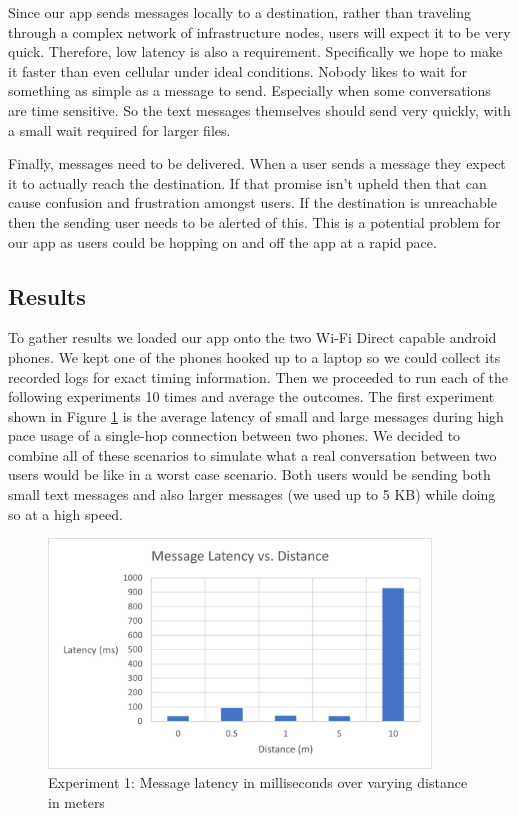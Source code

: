 \documentclass[10pt]{article}
\begin{document}
Since our app sends messages locally to a destination, rather than traveling through a complex network of infrastructure nodes, users will expect it to be very quick. Therefore, low latency is also a requirement. Specifically we hope to make it faster than even cellular under ideal conditions. Nobody likes to wait for something as simple as a message to send. Especially when some conversations are time sensitive. So the text messages themselves should send very quickly, with a small wait required for larger files.

Finally, messages need to be delivered. When a user sends a message they expect it to actually reach the destination. If that promise isn't upheld then that can cause confusion and frustration amongst users. If the destination is unreachable then the sending user needs to be alerted of this. This is a potential problem for our app as users could be hopping on and off the app at a rapid pace.

\subsection{Results}

To gather results we loaded our app onto the two Wi-Fi Direct capable android phones. We kept one of the phones hooked up to a laptop so we could collect its recorded logs for exact timing information. Then we proceeded to run each of the following experiments 10 times and average the outcomes. The first experiment shown in Figure \ref{results:message_latency} is the average latency of small and large messages during high pace usage of a single-hop connection between two phones. We decided to combine all of these scenarios to simulate what a real conversation between two users would be like in a worst case scenario. Both users would be sending both small text messages and also larger messages (we used up to 5 KB) while doing so at a high speed.

\begin{figure}[h!]
    \centering
    \includegraphics[width=4in]{message_latency_graph.png}
    \caption{Experiment 1: Message latency in milliseconds over varying distance in meters}
    \label{results:message_latency}
\end{figure}
\end{document}

